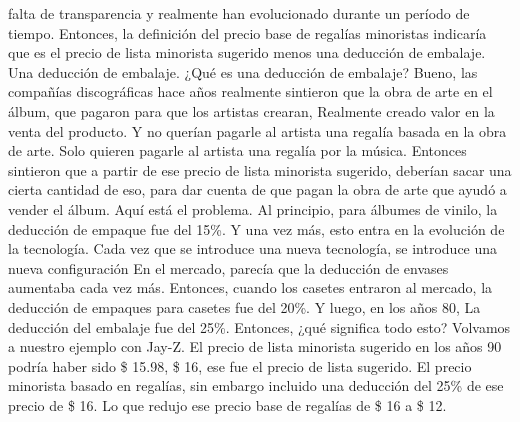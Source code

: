 \documentclass[10pt]{book}
\begin{document}
falta de transparencia y realmente han evolucionado durante un período de tiempo. Entonces, la definición del precio base de regalías minoristas indicaría que es el precio de lista minorista sugerido menos una deducción de embalaje. Una deducción de embalaje. ¿Qué es una deducción de embalaje? Bueno, las compañías discográficas hace años realmente sintieron que la obra de arte  en el álbum, que pagaron para que los artistas crearan, Realmente creado valor en la venta del producto. Y no querían pagarle al artista una regalía basada en la obra de arte. Solo quieren pagarle al artista una regalía por la música. Entonces sintieron que a partir de ese precio de lista minorista sugerido, deberían sacar una cierta cantidad de eso, para dar cuenta de que pagan la obra de arte que ayudó a vender el álbum. Aquí está el problema. Al principio, para álbumes de vinilo, la deducción de empaque fue del 15\%. Y una vez más, esto entra en la evolución de la tecnología. Cada vez que se introduce una nueva tecnología, se introduce una nueva configuración En el mercado, parecía que la deducción de envases aumentaba cada vez más. Entonces, cuando los casetes entraron al mercado, la deducción de empaques para casetes fue del 20\%. Y luego, en los años 80, La deducción del embalaje fue del 25\%. Entonces, ¿qué significa todo esto? Volvamos a nuestro ejemplo con Jay-Z. El precio de lista minorista sugerido en los años 90 podría haber sido \$ 15.98, \$ 16, ese fue el precio de lista sugerido. El precio minorista basado en regalías, sin embargo incluido una deducción del 25\% de ese precio de \$ 16. Lo que redujo ese precio base de regalías de \$ 16 a \$ 12.\\
\end{document}
